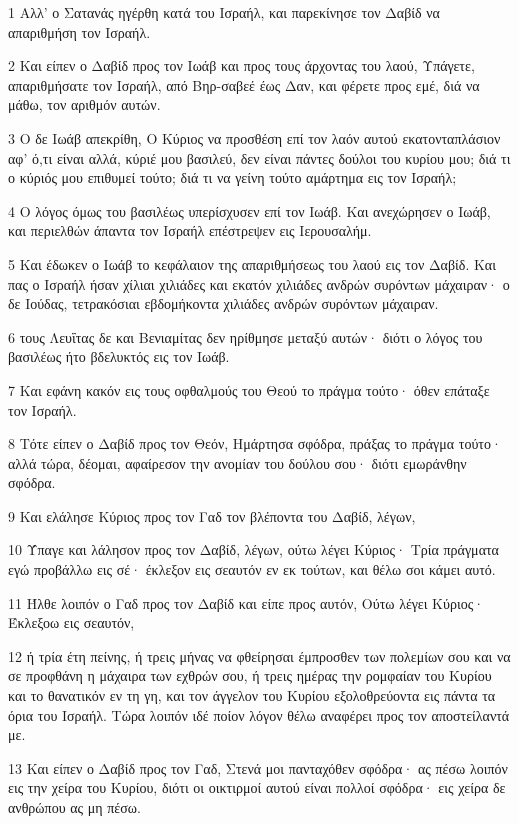 \par 1 Αλλ' ο Σατανάς ηγέρθη κατά του Ισραήλ, και παρεκίνησε τον Δαβίδ να απαριθμήση τον Ισραήλ.
\par 2 Και είπεν ο Δαβίδ προς τον Ιωάβ και προς τους άρχοντας του λαού, Υπάγετε, απαριθμήσατε τον Ισραήλ, από Βηρ-σαβεέ έως Δαν, και φέρετε προς εμέ, διά να μάθω, τον αριθμόν αυτών.
\par 3 Ο δε Ιωάβ απεκρίθη, Ο Κύριος να προσθέση επί τον λαόν αυτού εκατονταπλάσιον αφ' ό,τι είναι αλλά, κύριέ μου βασιλεύ, δεν είναι πάντες δούλοι του κυρίου μου; διά τι ο κύριός μου επιθυμεί τούτο; διά τι να γείνη τούτο αμάρτημα εις τον Ισραήλ;
\par 4 Ο λόγος όμως του βασιλέως υπερίσχυσεν επί τον Ιωάβ. Και ανεχώρησεν ο Ιωάβ, και περιελθών άπαντα τον Ισραήλ επέστρεψεν εις Ιερουσαλήμ.
\par 5 Και έδωκεν ο Ιωάβ το κεφάλαιον της απαριθμήσεως του λαού εις τον Δαβίδ. Και πας ο Ισραήλ ήσαν χίλιαι χιλιάδες και εκατόν χιλιάδες ανδρών συρόντων μάχαιραν· ο δε Ιούδας, τετρακόσιαι εβδομήκοντα χιλιάδες ανδρών συρόντων μάχαιραν.
\par 6 τους Λευΐτας δε και Βενιαμίτας δεν ηρίθμησε μεταξύ αυτών· διότι ο λόγος του βασιλέως ήτο βδελυκτός εις τον Ιωάβ.
\par 7 Και εφάνη κακόν εις τους οφθαλμούς του Θεού το πράγμα τούτο· όθεν επάταξε τον Ισραήλ.
\par 8 Τότε είπεν ο Δαβίδ προς τον Θεόν, Ημάρτησα σφόδρα, πράξας το πράγμα τούτο· αλλά τώρα, δέομαι, αφαίρεσον την ανομίαν του δούλου σου· διότι εμωράνθην σφόδρα.
\par 9 Και ελάλησε Κύριος προς τον Γαδ τον βλέποντα του Δαβίδ, λέγων,
\par 10 Ύπαγε και λάλησον προς τον Δαβίδ, λέγων, ούτω λέγει Κύριος· Τρία πράγματα εγώ προβάλλω εις σέ· έκλεξον εις σεαυτόν εν εκ τούτων, και θέλω σοι κάμει αυτό.
\par 11 Ήλθε λοιπόν ο Γαδ προς τον Δαβίδ και είπε προς αυτόν, Ούτω λέγει Κύριος· Έκλεξοω εις σεαυτόν,
\par 12 ή τρία έτη πείνης, ή τρεις μήνας να φθείρησαι έμπροσθεν των πολεμίων σου και να σε προφθάνη η μάχαιρα των εχθρών σου, ή τρεις ημέρας την ρομφαίαν του Κυρίου και το θανατικόν εν τη γη, και τον άγγελον του Κυρίου εξολοθρεύοντα εις πάντα τα όρια του Ισραήλ. Τώρα λοιπόν ιδέ ποίον λόγον θέλω αναφέρει προς τον αποστείλαντά με.
\par 13 Και είπεν ο Δαβίδ προς τον Γαδ, Στενά μοι πανταχόθεν σφόδρα· ας πέσω λοιπόν εις την χείρα του Κυρίου, διότι οι οικτιρμοί αυτού είναι πολλοί σφόδρα· εις χείρα δε ανθρώπου ας μη πέσω.
